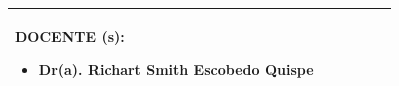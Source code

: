 \documentclass[10pt]{article}   %
\newcommand{\itemTeacher}{Dr(a). Richart Smith Escobedo Quispe}
\begin{document}
\begin{table}[h!]
\begin{tabular}{|m{2.4cm}|m{2.1cm}|m{2.4cm}|m{2cm}|m{2.64cm}|m{2.42cm}|}
{\begin{minipage}{8cm}
                \vspace{0.5em} %
                DOCENTE (s):
                \begin{itemize}
                    \setlength{\itemsep}{0pt}
                    \setlength{\parskip}{0pt}
                    \setlength{\parsep}{0pt}
                    \item \itemTeacher
                \end{itemize}
                \vspace{0em} %
            \end{minipage}}\\ \hline 	
        \end{tabular}
    \end{table}
    \normalsize
    
    
\end{document}
